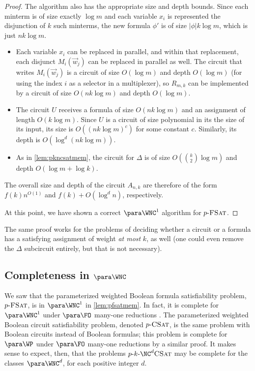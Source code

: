 \begin{proof}
  The algorithm also has the appropriate size and depth bounds.
  Since each minterm is of size exactly $\log m$ and each variable $x_i$ is represented the disjunction of $k$ such minterms, the new formula $\phi'$ is of size $|\phi| k \log m$, which is just $n k \log m$.
  \begin{itemize}
  \item
    Each variable $x_i$ can be replaced in parallel, and within that replacement, each disjunct $M_i(\vec{w}_j)$ can be replaced in parallel as well.
    The circuit that writes $M_i(\vec{w}_j)$ is a circuit of size $O(\log m)$ and depth $O(\log m)$ (for using the index $i$ as a selector in a multiplexer), so $R_{m, k}$ can be implemented by a circuit of size $O(n k \log m)$ and depth $O(\log m)$.
  \item
    The circuit $U$ receives a formula of size $O(n k \log m)$ and an assignment of length $O(k \log m)$.
    Since $U$ is a circuit of size polynomial in its the size of its input, its size is $O((n k \log m)^c)$ for some constant $c$.
    Similarly, its depth is $O(\log^d (n k \log m))$.
  \item As in \autoref{lem:pkncsatmem}, the circuit for $\Delta$ is of size $O(\binom{k}{2} \log m)$ and depth $O(\log m + \log k)$.
  \end{itemize}
  The overall size and depth of the circuit $A_{n, k}$ are therefore of the form $f(k) n^{O(1)}$ and $f(k) + O(\log^d n)$, respectively.

  At this point, we have shown a correct $\para \WNC^1$ algorithm for $p \textnormal{-} \textsc{FSat}$.
\end{proof}

The same proof works for the problems of deciding whether a circuit or a formula has a satisfying assignment of weight \emph{at most} $k$, as well (one could even remove the $\Delta$ subcircuit entirely, but that is not necessary).

\subsection{Completeness in \texorpdfstring{$\para \WNC$}{paraWNC}}

We saw that the parameterized weighted Boolean formula satisfiability problem, $p \textnormal{-} \textsc{FSat}$, is in $\para \WNC^1$ in \autoref{lem:pfsatmem}.
In fact, it is complete for $\para \WNC^1$ under $\para \FO$ many-one reductions \autocite[Theorem~3.6]{est15}.
The parameterized weighted Boolean circuit satisfiability problem, denoted $p \textnormal{-} \textsc{CSat}$, is the same problem with Boolean circuits instead of Boolean formulas; this problem is complete for $\para \WP$ under $\para \FO$ many-one reductions by a similar proof.
It makes sense to expect, then, that the problems $\pNCSAT$ may be complete for the classes $\para \WNC^d$, for each positive integer $d$.


